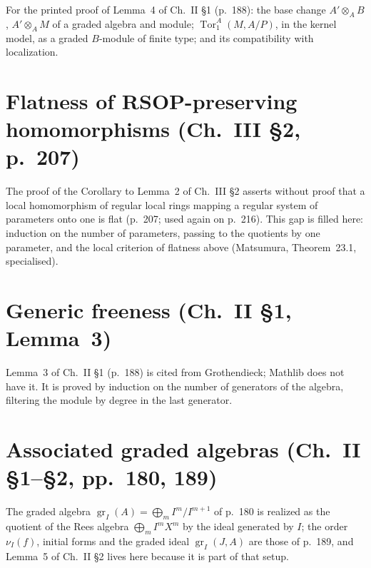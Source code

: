 
For the printed proof of Lemma~4 of Ch.~II \S1 (p.~188): the base change $A'\otimes_AB$, $A'\otimes_AM$ of a graded algebra
and module; $\operatorname{Tor}_1^A(M,A/P)$, in the kernel model, as a graded $B$-module of finite type; and its
compatibility with localization.


\section{Flatness of RSOP-preserving homomorphisms (Ch.~III \S2, p.~207)}

The proof of the Corollary to Lemma~2 of Ch.~III \S2 asserts without proof that a local
homomorphism of regular local rings mapping a regular system of parameters onto one is flat
(p.~207; used again on p.~216).  This gap is filled here: induction on the number of
parameters, passing to the quotients by one parameter, and the local criterion of flatness
above (Matsumura, Theorem~23.1, specialised).


\section{Generic freeness (Ch.~II \S1, Lemma~3)}

Lemma~3 of Ch.~II \S1 (p.~188) is cited from Grothendieck; Mathlib does not have it.  It is
proved by induction on the number of generators of the algebra, filtering the module by degree
in the last generator.


\section{Associated graded algebras (Ch.~II \S1--\S2, pp.~180, 189)}

The graded algebra $\operatorname{gr}_I(A)=\bigoplus_m I^m/I^{m+1}$ of p.~180 is realized as the
quotient of the Rees algebra $\bigoplus_m I^mX^m$ by the ideal generated by $I$; the order
$\nu_I(f)$, initial forms and the graded ideal $\operatorname{gr}_I(J,A)$ are those of p.~189, and
Lemma~5 of Ch.~II \S2 lives here because it is part of that setup.

